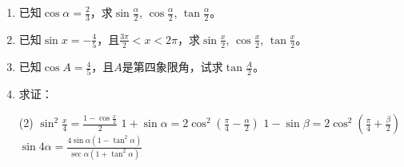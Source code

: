 \begin{ex}
\begin{enumerate}
    \item 已知$\cos\alpha=\frac{2}{3}$，求$\sin\frac{\alpha}{2}$, $\cos \frac{\alpha}{2}$, $\tan \frac{\alpha}{2}$。
    \item 已知$\sin x=-\frac{4}{5}$，且$\frac{3\pi}{2}<x<2\pi$，求$\sin\frac{x}{2}$, $\cos \frac{x}{2}$, $\tan \frac{x}{2}$。
    \item 已知$\cos A=\frac{4}{5}$，且$A$是第四象限角，试求$\tan\frac{A}{2}$。
    \item 求证：
\begin{tasks}(2)
    \task $\sin^2\frac{x}{4}=\frac{1-\cos\frac{x}{2}}{2}$
    \task $1+\sin\alpha=2\cos^2\left(\frac{\pi}{4}-\frac{\alpha}{2}\right)$
    \task $1-\sin\beta=2\cos^2\left(\frac{\pi}{4}+\frac{\beta}{2}\right)$
    \task $\sin 4\alpha=\frac{4\sin\alpha(1-\tan^2\alpha)}{\sec\alpha(1+\tan^2\alpha)}$
\end{tasks}        
\end{enumerate}    
\end{ex}

